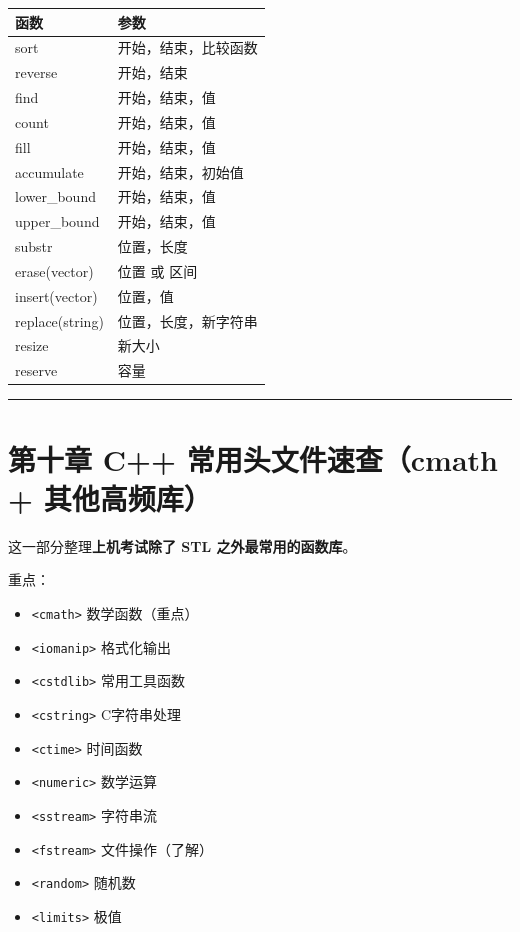 \documentclass[9pt,twocolumn]{extarticle}
\begin{document}
\begin{table}[h]
\centering
\begin{tabular}{|l|l|}
\hline
函数 & 参数 \\ \hline
sort & 开始，结束，比较函数 \\ \hline
reverse & 开始，结束 \\ \hline
find & 开始，结束，值 \\ \hline
count & 开始，结束，值 \\ \hline
fill & 开始，结束，值 \\ \hline
accumulate & 开始，结束，初始值 \\ \hline
lower\_bound & 开始，结束，值 \\ \hline
upper\_bound & 开始，结束，值 \\ \hline
substr & 位置，长度 \\ \hline
erase(vector) & 位置 或 区间 \\ \hline
insert(vector) & 位置，值 \\ \hline
replace(string) & 位置，长度，新字符串 \\ \hline
resize & 新大小 \\ \hline
reserve & 容量 \\ \hline
\end{tabular}
\end{table}

\noindent\rule{\linewidth}{0.4pt}

\section{第十章 C++ 常用头文件速查（cmath + 其他高频库）}

这一部分整理\textbf{上机考试除了 STL 之外最常用的函数库}。

重点：
\begin{itemize}
    \item \texttt{<cmath>} 数学函数（重点）
    \item \texttt{<iomanip>} 格式化输出
    \item \texttt{<cstdlib>} 常用工具函数
    \item \texttt{<cstring>} C字符串处理
    \item \texttt{<ctime>} 时间函数
    \item \texttt{<numeric>} 数学运算
    \item \texttt{<sstream>} 字符串流
    \item \texttt{<fstream>} 文件操作（了解）
    \item \texttt{<random>} 随机数
    \item \texttt{<limits>} 极值
\end{itemize}
\end{document}
